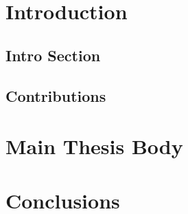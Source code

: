 \documentclass[british,12pt]{phdthesis}
\newif\ifincchapters
\begin{document}
\begin{abstract}
\label{ch:abstract}

\end{abstract}

\setcounter{secnumdepth}{2}

\tableofcontents



\chapter{Introduction}
\label{ch:introduction}
\ifincchapters

\fi

\section{Intro Section}
\label{sec:introsub}


\section{Contributions}
\label{ch:contributions}
\ifincchapters

\fi


\chapter{Main Thesis Body}
\label{ch:main1}
\ifincchapters

\fi
\newpage


\chapter{Conclusions}
\label{ch:conclusions}
\ifincchapters

\fi
\newpage


\end{document}
